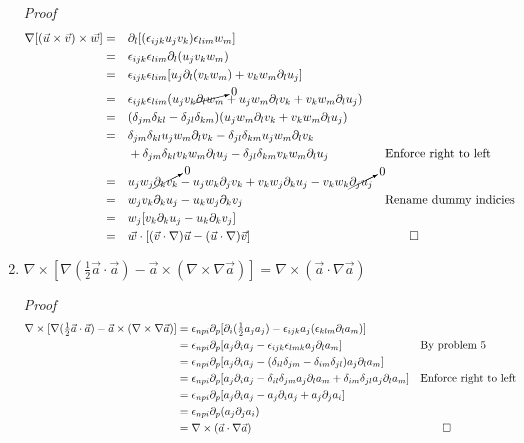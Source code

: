 \documentclass[11pt,twoside]{article}
\renewcommand{\d}{\partial}
\newcommand{\vect}[1]{\vec{#1}}
\newcommand{\grad}{\nabla}
\newcommand{\cross}{\times}
\newcommand{\inline}[1]{\mbox{$#1$}}
\begin{document}
\begin{enumerate}
\textit{Proof}
\begin{align*}
\grad[(\vect{u}\cross\vect{v})\cross\vect{w}] 
            & = && \d_l[(\epsilon_{ijk}u_jv_k)\epsilon_{lim}w_m]\\
            & = && \epsilon_{ijk}\epsilon_{lim}\d_l(u_jv_kw_m)\\
            & = && \epsilon_{ijk}\epsilon_{lim}[u_j\d_l(v_kw_m)+v_kw_m\d_lu_j]\\
            & = && \epsilon_{ijk}\epsilon_{lim}(u_jv_k\cancelto{0}{\d_lw_m}+u_jw_m\d_lv_k+v_kw_m\d_lu_j)\\
            & = &&  (\delta_{jm}\delta_{kl}-\delta_{jl}\delta_{km})(u_jw_m\d_lv_k+v_kw_m\d_lu_j)\\
            & = && \delta_{jm}\delta_{kl}u_jw_m\d_lv_k-\delta_{jl}\delta_{km}u_jw_m\d_lv_k\\
            &   &&+ \delta_{jm}\delta_{kl}v_kw_m\d_lu_j-\delta_{jl}\delta_{km}v_kw_m\d_lu_j 
                && \text{Enforce right to left}\\
            & = && u_jw_j\cancelto{0}{\d_kv_k}-u_jw_k\d_jv_k+v_kw_j\d_ku_j-v_kw_k\cancelto{0}{\d_ju_j}\\
            & = && w_jv_k\d_ku_j-u_kw_j\d_kv_j && \text{Rename dummy indicies}\\
            & = && w_j[v_k\d_ku_j-u_k\d_kv_j]\\
            & = && \vect{w}\cdot[(\vect{v}\cdot\grad)\vect{u}-(\vect{u}\cdot\grad)\vect{v}] && \qed
\end{align*}


%
%
\item $\grad\cross[\grad(\inline{\frac{1}{2}}\vect{a}\cdot\vect{a})-\vect{a}\cross(\grad\cross\grad\vect{a})] = \grad\cross(\vect{a}\cdot\grad\vect{a})$

\textit{Proof}
\begin{align*}
\grad\cross[\grad(\inline{\frac{1}{2}}\vect{a}\cdot\vect{a})-\vect{a}\cross(\grad\cross\grad\vect{a})] 
   & = \epsilon_{npi}\d_p[\d_i(\inline{\frac{1}{2}}a_ja_j)-\epsilon_{ijk}a_j(\epsilon_{klm}\d_la_m)]\\
   & = \epsilon_{npi}\d_p[a_j\d_ia_j-\epsilon_{ijk}\epsilon_{lmk}a_j\d_la_m] && \text{By problem 5}\\
   & = \epsilon_{npi}\d_p[a_j\d_ia_j- (\delta_{il}\delta_{jm}-\delta_{im}\delta_{jl})a_j\d_la_m]\\
   & = \epsilon_{npi}\d_p[a_j\d_ia_j - \delta_{il}\delta_{jm}a_j\d_la_m+\delta_{im}\delta_{jl}a_j\d_la_m] && \text{Enforce right to left}\\
   & = \epsilon_{npi}\d_p[a_j\d_ia_j - a_j\d_ia_j + a_j\d_ja_i] \\
   & = \epsilon_{npi}\d_p(a_j\d_ja_i) \\
   & = \grad\cross(\vect{a}\cdot\grad\vect{a}) && \qed\\
\end{align*}



\end{enumerate}
\end{document}
